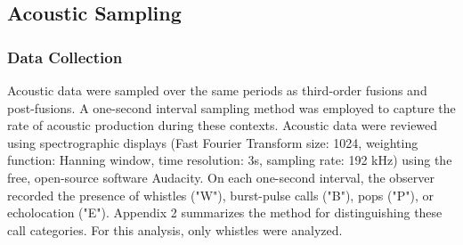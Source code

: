\documentclass[11pt]{amsart}
\begin{document}
%
%
%


\subsection{Acoustic Sampling}
\subsubsection{Data Collection}

Acoustic data were sampled over the same periods as third-order fusions and post-fusions. A one-second interval sampling method was employed to capture the rate of acoustic production during these contexts. Acoustic data were reviewed using spectrographic displays (Fast Fourier Transform size: 1024, weighting function: Hanning window, time resolution: 3s, sampling rate: 192 kHz) using the free, open-source software Audacity. On each one-second interval, the observer recorded the presence of whistles ("W"), burst-pulse calls ("B"), pops ("P"), or echolocation ("E").  Appendix 2 summarizes the method for distinguishing these call categories. For this analysis, only whistles were analyzed. %

\end{document}
